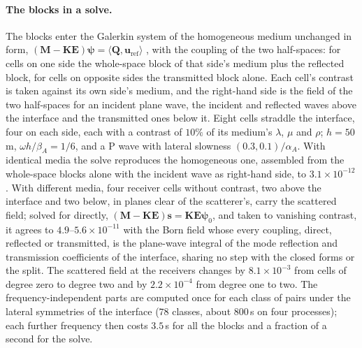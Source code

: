 \documentclass[11pt,a4paper]{article}
\newcommand{\bK}{\mathbf{K}}
\begin{document}
\paragraph{The blocks in a solve.} The blocks enter the Galerkin system of the homogeneous medium unchanged in
form, $(\mathbf M-\bK\mathbf E)\boldsymbol\psi=\langle\mathbf Q,\mathbf u_{\mathrm{ref}}\rangle$
\citep{NestorLegendre2026,NestorCoupling2026}, with the coupling of the two half-spaces: for cells on one side the
whole-space block of that side's medium plus the reflected block, for cells on opposite sides the transmitted block
alone. Each cell's contrast is taken against its own side's medium, and the right-hand side is the field of the
two half-spaces for an incident plane wave, the incident and reflected waves above the interface and the
transmitted ones below it. Eight cells straddle the interface, four on each side, each with a contrast of $10\%$
of its medium's $\lambda$, $\mu$ and $\rho$; $h=50$\,m, $\omega h/\beta_A=1/6$, and a P wave with lateral slowness
$(0.3,0.1)/\alpha_A$. With identical media the solve reproduces the homogeneous one, assembled from the whole-space
blocks alone with the incident wave as right-hand side, to $3.1\times10^{-12}$. With different media, four
receiver cells without contrast, two above the interface and two below, in planes clear of the scatterer's, carry
the scattered field; solved for directly, $(\mathbf M-\bK\mathbf E)\mathbf s=\bK\mathbf E\boldsymbol\psi_0$, and
taken to vanishing contrast, it agrees to $4.9$--$5.6\times10^{-11}$ with the Born field whose every coupling,
direct, reflected or transmitted, is the plane-wave integral of the mode reflection and transmission
coefficients of the interface, sharing no step with the closed forms or the split. The scattered field at the
receivers changes by $8.1\times10^{-3}$ from cells of degree zero to degree two and by $2.2\times10^{-4}$ from
degree one to two. The frequency-independent parts are computed once for each class of pairs under the lateral
symmetries of the interface ($78$ classes, about $800$\,s on four processes); each further frequency then costs
$3.5$\,s for all the blocks and a fraction of a second for the solve.
\end{document}
